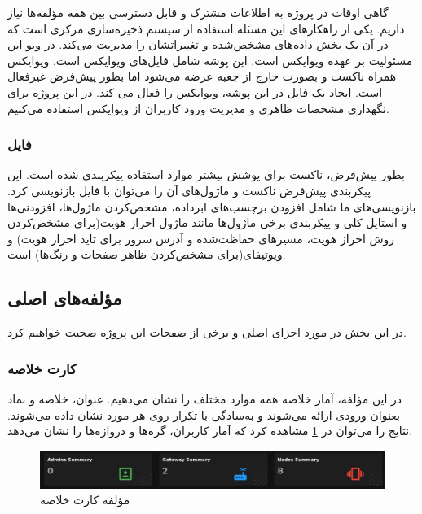 گاهی اوقات در پروژه به اطلاعات مشترک و قابل دسترسی بین همه مؤلفه‌ها نیاز داریم. یکی از راهکارهای این مسئله استفاده از سیستم ذخیره‌سازی مرکزی است که در آن یک بخش داده‌های مشخص‌شده و تغییراتشان را مدیریت می‌کند. در ویو این مسئولیت بر عهده ویوایکس است. این پوشه شامل فایل‌های ویوایکس است. ویوایکس همراه ناکست و بصورت خارج از جعبه عرضه می‌شود اما بطور پیش‌فرض غیرفعال است. ایجاد یک فایل  در این پوشه، ویوایکس را فعال می کند\cite{nuxt}. در این پروژه برای نگهداری مشخصات ظاهری و مدیریت ورود کاربران از ویوایکس استفاده می‌کنیم.

\subsubsection{فایل }

بطور پیش‌فرض، ناکست برای پوشش بیشتر موارد استفاده پیکربندی شده است. این پیکربندی پیش‌فرض ناکست و ماژول‌های آن را می‌توان با فایل  بازنویسی کرد\cite{nuxt}. بازنویسی‌های ما شامل افزودن برچسب‌های ابرداده، مشخص‌کردن ماژول‌ها، افزودنی‌ها و استایل کلی و پیکربندی برخی ماژول‌ها مانند ماژول احراز هویت(برای مشخص‌کردن روش احراز هویت، مسیرهای حفاظت‌شده و آدرس سرور برای تاید احراز هویت) و ویوتیفای(برای مشخص‌کردن ظاهر صفحات و رنگ‌ها) است.

\subsection{مؤلفه‌های اصلی}

در این بخش در مورد اجزای اصلی و برخی از صفحات این پروژه صحبت خواهیم کرد.


\subsubsection{کارت خلاصه}

در این مؤلفه، آمار خلاصه همه موارد مختلف را نشان می‌دهیم. عنوان، خلاصه و نماد بعنوان ورودی ارائه می‌شوند و به‌سادگی با تکرار روی هر مورد نشان داده می‌شوند. نتایج را می‌توان در \cref{fig:summary_card} مشاهده کرد که آمار کاربران، گره‌ها و دروازه‌ها را نشان می‌دهد.

\begin{figure}[!h]
\centering\includegraphics[scale=.45]{summary_card.png}
\caption{مؤلفه کارت خلاصه}\label{fig:summary_card}
\end{figure}


